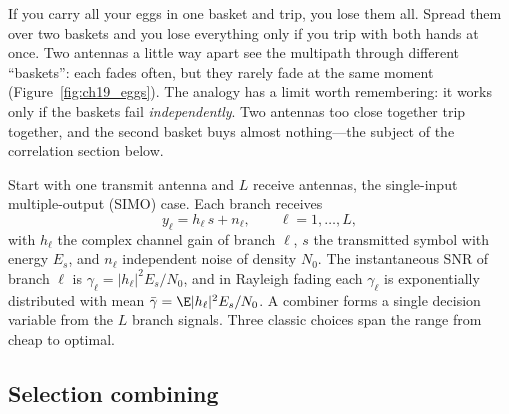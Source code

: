\begin{analogy}
If you carry all your eggs in one basket and trip, you lose them all. Spread them over two baskets
and you lose everything only if you trip with both hands at once. Two antennas a little way apart
see the multipath through different ``baskets'': each fades often, but they rarely fade at the
same moment (Figure~\ref{fig:ch19_eggs}). The analogy has a limit worth remembering: it works only
if the baskets fail \emph{independently}. Two antennas too close together trip together, and the
second basket buys almost nothing---the subject of the correlation section below.
\end{analogy}


Start with one transmit antenna and $L$ receive antennas, the single-input multiple-output (SIMO)
case. Each branch receives
\begin{equation}
y_\ell=h_\ell\,s+n_\ell,\qquad \ell=1,\dots,L,
\end{equation}
with $h_\ell$ the complex channel gain of branch $\ell$, $s$ the transmitted symbol with energy
$E_s$, and $n_\ell$ independent noise of density $N_0$. The instantaneous SNR of branch $\ell$ is
$\gamma_\ell=|h_\ell|^2E_s/N_0$, and in Rayleigh fading each $\gamma_\ell$ is exponentially
distributed with mean $\bar\gamma=\E|h_\ell|^2E_s/N_0$. A combiner forms a single decision
variable from the $L$ branch signals. Three classic choices span the range from cheap to optimal.

\subsection{Selection combining}

